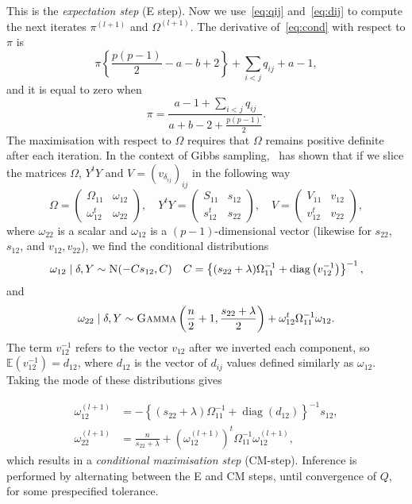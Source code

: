 \documentclass[a4paper, 11pt, oneside]{report}
\DeclareMathOperator{\diag}{diag}
\newcommand{\E}{\mathbb{E}}
\newcommand{\1}{\mathds{1}}
\newcommand{\inv}{^{-1}}
\newcommand{\Nor}{\textsc{N}}
\begin{document}
This is the \emph{expectation step} (E step).
Now we use~\eqref{eq:qij} and~\eqref{eq:dij} to compute the next iterates $\pi^{(l+1)}$ and $\Omega^{(l+1)}$.
The derivative of~\eqref{eq:cond} with respect to $\pi$ is
\[\pi\left\{\frac{p(p-1)}{2} - a - b + 2\right\} + \sum_{i<j} q_{ij} + a - 1,\]
and it is equal to zero when \[\pi = \frac{a-1 + \sum_{i<j}q_{ij}}{a + b - 2 +
	\frac{p(p-1)}{2}}.\]
The maximisation with respect to $\Omega$ requires that $\Omega$ remains positive definite
after each iteration. In the context of Gibbs sampling,~\citet{wang-2015} has shown that if we
slice the matrices $\Omega$, $Y^t Y$ and $V = {(v_{\delta_{ij}})}_{ij}$ in the following way
\[\Omega = \begin{pmatrix}
		\Omega_{11}   & \omega_{12} \\
		\omega_{12}^t & \omega_{22}
	\end{pmatrix},
	\quad
	Y^t Y = \begin{pmatrix}
		S_{11}   & s_{12} \\
		s_{12}^t & s_{22}
	\end{pmatrix},
	\quad
	V = \begin{pmatrix}
		V_{11}   & v_{12} \\
		v_{12}^t & v_{22}
	\end{pmatrix},
\]
where $\omega_{22}$ is a scalar and $\omega_{12}$ is a $(p-1)$-dimensional
vector (likewise for $s_{22}$, $s_{12}$, and $v_{12}, v_{22}$), we find the
conditional distributions
\[
  \omega_{12} \mid \delta, Y \sim \Nor(-C s_{12}, C) \quad C=\left\{(s_{22} +
  \lambda) \Omega_{11}^{-1} + \diag\left(v_{12}^{-1}\right)\right\}\inv,
\]
and
\[\omega_{22} \mid \delta , Y \sim \textsc{Gamma}\left(\frac{n}{2} + 1, \frac{s_{22} +
		\lambda}{2}\right) + \omega_{12}^t\Omega_{11}^{-1}\omega_{12}.\]
The term $v_{12}^{-1}$ refers to the vector $v_{12}$ after we inverted each
component, so $\E\left(v_{12}^{-1}\right) = d_{12}$, where $d_{12}$ is the
vector of $d_{ij}$ values defined similarly as $\omega_{12}$.
Taking the mode of these distributions gives

\begin{align*}
	\omega_{12}^{(l+1)} & = -{\left\{(s_{22} + \lambda) \Omega_{11}^{-1} + \diag(d_{12})\right\}^{-1}} s_{12},                   \\
	\omega_{22}^{(l+1)} & = \frac{n}{s_{22} + \lambda} + \left(\omega_{12}^{(l+1)}\right)^t \Omega_{11}^{-1}\omega_{12}^{(l+1)},
\end{align*}
which results in a \emph{conditional maximisation step} (CM-step).
Inference is performed by alternating between the E and CM steps, until convergence of $Q$, for some prespecified tolerance.
\end{document}
